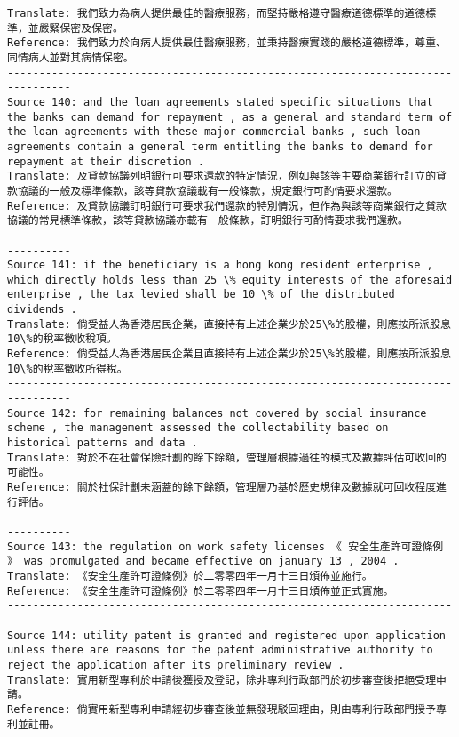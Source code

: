 \documentclass[11pt]{article}
\begin{document}
\begin{Verbatim}[commandchars=\\\{\}]
Translate: 我們致力為病人提供最佳的醫療服務，而堅持嚴格遵守醫療道德標準的道德標準，並嚴緊保密及保密。
Reference: 我們致力於向病人提供最佳醫療服務，並秉持醫療實踐的嚴格道德標準，尊重、同情病人並對其病情保密。
--------------------------------------------------------------------------------
Source 140: and the loan agreements stated specific situations that the banks can demand for repayment , as a general and standard term of the loan agreements with these major commercial banks , such loan agreements contain a general term entitling the banks to demand for repayment at their discretion .
Translate: 及貸款協議列明銀行可要求還款的特定情況，例如與該等主要商業銀行訂立的貸款協議的一般及標準條款，該等貸款協議載有一般條款，規定銀行可酌情要求還款。
Reference: 及貸款協議訂明銀行可要求我們還款的特別情況，但作為與該等商業銀行之貸款協議的常見標準條款，該等貸款協議亦載有一般條款，訂明銀行可酌情要求我們還款。
--------------------------------------------------------------------------------
Source 141: if the beneficiary is a hong kong resident enterprise , which directly holds less than 25 \% equity interests of the aforesaid enterprise , the tax levied shall be 10 \% of the distributed dividends .
Translate: 倘受益人為香港居民企業，直接持有上述企業少於25\%的股權，則應按所派股息10\%的稅率徵收稅項。
Reference: 倘受益人為香港居民企業且直接持有上述企業少於25\%的股權，則應按所派股息10\%的稅率徵收所得稅。
--------------------------------------------------------------------------------
Source 142: for remaining balances not covered by social insurance scheme , the management assessed the collectability based on historical patterns and data .
Translate: 對於不在社會保險計劃的餘下餘額，管理層根據過往的模式及數據評估可收回的可能性。
Reference: 關於社保計劃未涵蓋的餘下餘額，管理層乃基於歷史規律及數據就可回收程度進行評估。
--------------------------------------------------------------------------------
Source 143: the regulation on work safety licenses 《 安全生產許可證條例 》 was promulgated and became effective on january 13 , 2004 .
Translate: 《安全生產許可證條例》於二零零四年一月十三日頒佈並施行。
Reference: 《安全生產許可證條例》於二零零四年一月十三日頒佈並正式實施。
--------------------------------------------------------------------------------
Source 144: utility patent is granted and registered upon application unless there are reasons for the patent administrative authority to reject the application after its preliminary review .
Translate: 實用新型專利於申請後獲授及登記，除非專利行政部門於初步審查後拒絕受理申請。
Reference: 倘實用新型專利申請經初步審查後並無發現駁回理由，則由專利行政部門授予專利並註冊。

\end{Verbatim}
\end{document}

